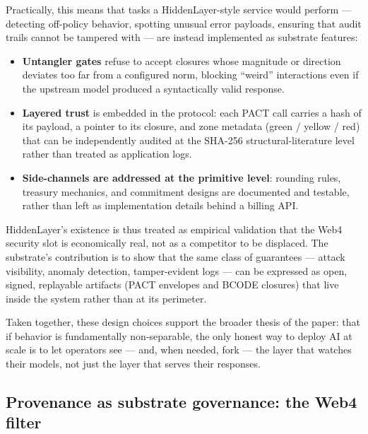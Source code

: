 Practically, this means that tasks a HiddenLayer-style service would
perform --- detecting off-policy behavior, spotting unusual error
payloads, ensuring that audit trails cannot be tampered with --- are
instead implemented as substrate features:

\begin{itemize}
\tightlist
\item
  \textbf{Untangler gates} refuse to accept closures whose magnitude or
  direction deviates too far from a configured norm, blocking ``weird''
  interactions even if the upstream model produced a syntactically valid
  response.
\item
  \textbf{Layered trust} is embedded in the protocol: each PACT call
  carries a hash of its payload, a pointer to its closure, and zone
  metadata (green / yellow / red) that can be independently audited at
  the SHA-256 structural-literature level rather than treated as
  application logs.
\item
  \textbf{Side-channels are addressed at the primitive level}: rounding
  rules, treasury mechanics, and commitment designs are documented and
  testable, rather than left as implementation details behind a billing
  API.
\end{itemize}

HiddenLayer's existence is thus treated as empirical validation that the
Web4 security slot is economically real, not as a competitor to be
displaced. The substrate's contribution is to show that the same class
of guarantees --- attack visibility, anomaly detection, tamper-evident
logs --- can be expressed as open, signed, replayable artifacts (PACT
envelopes and BCODE closures) that live inside the system rather than at
its perimeter.

Taken together, these design choices support the broader thesis of the
paper: that if behavior is fundamentally non-separable, the only honest
way to deploy AI at scale is to let operators see --- and, when needed,
fork --- the layer that watches their models, not just the layer that
serves their responses.

\subsection{Provenance as substrate governance: the Web4
filter}\label{provenance-as-substrate-governance-the-web4-filter}

